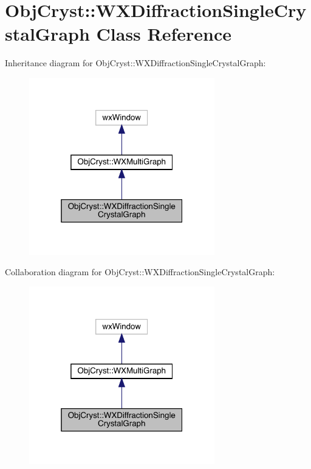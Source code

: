 \hypertarget{class_obj_cryst_1_1_w_x_diffraction_single_crystal_graph}{}\section{Obj\+Cryst\+::W\+X\+Diffraction\+Single\+Crystal\+Graph Class Reference}
\label{class_obj_cryst_1_1_w_x_diffraction_single_crystal_graph}


Inheritance diagram for Obj\+Cryst\+::W\+X\+Diffraction\+Single\+Crystal\+Graph\+:
\nopagebreak
\begin{figure}[H]
\begin{center}
\leavevmode
\includegraphics[width=229pt]{class_obj_cryst_1_1_w_x_diffraction_single_crystal_graph__inherit__graph}
\end{center}
\end{figure}


Collaboration diagram for Obj\+Cryst\+::W\+X\+Diffraction\+Single\+Crystal\+Graph\+:
\nopagebreak
\begin{figure}[H]
\begin{center}
\leavevmode
\includegraphics[width=229pt]{class_obj_cryst_1_1_w_x_diffraction_single_crystal_graph__coll__graph}
\end{center}
\end{figure}

